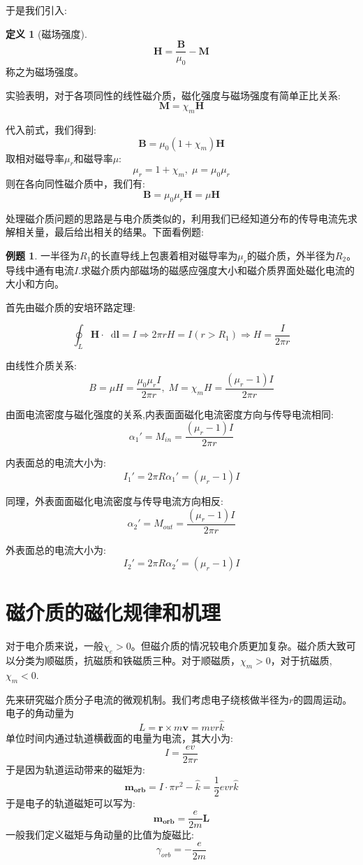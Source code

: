 \documentclass[12pt,a4paper,oneside]{report}
\theoremstyle{definition}
\newtheorem{definition}{定义}[chapter]
\newtheorem{example}{例题}[chapter]
\theoremstyle{remark}
\newcommand{\mb}[1]{\mathbf{#1}}
\renewcommand{\d}{\mathop{}\!\mathrm{d}}
\begin{document}
于是我们引入:
\begin{definition}[磁场强度]
  

\[
\mathbf{H} = \frac{\mb{B}}{\mu_0}-\mb{M}
\]
称之为磁场强度。
\end{definition}
实验表明，对于各项同性的线性磁介质，磁化强度与磁场强度有简单正比关系:
\[
\mathbf{M} = \chi_m \mathbf{H}
\]

代入前式，我们得到:
\[
\mathbf{B} = \mu_0(1+\chi_m)\mathbf{H}
\]
取相对磁导率$\mu_r$和磁导率$\mu$:
\[
\mu_r = 1+\chi_m,\; \mu = \mu_0 \mu_r
\]
则在各向同性磁介质中，我们有:
\[
\mathbf{B} = \mu_0\mu_r \mathbf{H} = \mu \mathbf{H}
\]

处理磁介质问题的思路是与电介质类似的，利用我们已经知道分布的传导电流先求解相关量，最后给出相关的结果。下面看例题:
\begin{example}
  
一半径为$R_1$的长直导线上包裹着相对磁导率为$\mu_r$的磁介质，外半径为$R_2$。导线中通有电流$I$.求磁介质内部磁场的磁感应强度大小和磁介质界面处磁化电流的大小和方向。

首先由磁介质的安培环路定理:

\[
\oint_L \mathbf{H}\cdot \d \mb{l} = I \Rightarrow 2\pi r H = I (r>R_1) \Rightarrow H = \frac{I}{2\pi r} 
\]

由线性介质关系:
\[
B = \mu H = \frac{\mu_0\mu_r I}{2\pi r}, \; M = \chi_m H =\frac{(\mu_r-1) I}{2\pi r}
\]

由面电流密度与磁化强度的关系,内表面面磁化电流密度方向与传导电流相同:
\[
\alpha_1' = M_{in}  = \frac{(\mu_r-1) I}{2\pi r}
\]

内表面总的电流大小为:
\[
I_1' = 2\pi R\alpha_1' = (\mu_r-1) I
\]

同理，外表面面磁化电流密度与传导电流方向相反:
\[
\alpha_2' = M_{out}  = \frac{(\mu_r-1) I}{2\pi r}
\]

外表面总的电流大小为:
\[
I_2' = 2\pi R\alpha_2' = (\mu_r-1) I
\]
\end{example}


\section{磁介质的磁化规律和机理}
对于电介质来说，一般$\chi_e>0$。但磁介质的情况较电介质更加复杂。磁介质大致可以分类为顺磁质，抗磁质和铁磁质三种。对于顺磁质，$\chi_m>0$，对于抗磁质,$\chi_m<0$.

先来研究磁介质分子电流的微观机制。我们考虑电子绕核做半径为$r$的圆周运动。电子的角动量为
\[
L=\mathbf{r}\times m\mathbf{v}=mvr\hat{k}
\]
单位时间内通过轨道横截面的电量为电流，其大小为:
\[
I=\frac{ev}{2\pi r}
\]
于是因为轨道运动带来的磁矩为:
\[
\mathbf{m_{orb}} = I \cdot \pi r^2 -\hat{k} = \frac{1}{2}evr\hat{k}
\]
于是电子的轨道磁矩可以写为:
\[
\mathbf{m_{orb}}=\frac{e}{2m}\mathbf{L}
\]
一般我们定义磁矩与角动量的比值为旋磁比:
\[
\gamma_{orb}=-\frac{e}{2m}
\]
\end{document}

